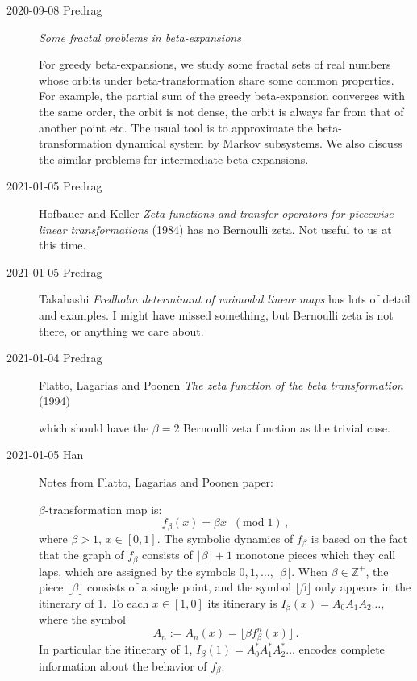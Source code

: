 \begin{description}


\item[2020-09-08 Predrag]
{\em Some fractal problems in beta-expansions}

For greedy beta-expansions, we study some fractal sets of real numbers
whose orbits under beta-transformation share some common properties. For
example, the partial sum of the greedy beta-expansion converges with the
same order, the orbit is not dense, the orbit is always far from that of
another point etc. The usual tool is to approximate the
beta-transformation dynamical system by Markov subsystems. We also
discuss the similar problems for intermediate beta-expansions.

\item[2021-01-05 Predrag]
Hofbauer and Keller {\em Zeta-functions and
transfer-operators for piecewise linear transformations} (1984) has no
Bernoulli zeta. Not useful to us at this time.

\item[2021-01-05 Predrag]
Takahashi {\em Fredholm determinant of unimodal linear
maps} has lots of detail and examples. I might have missed something, but
Bernoulli zeta is not there, or anything we care about.

\item[2021-01-04 Predrag]
Flatto, Lagarias and Poonen
{\em The zeta function of the beta transformation} (1994)

which should have the $\beta=2$ Bernoulli zeta function
as the trivial case.

\item[2021-01-05 Han] Notes from Flatto, Lagarias and Poonen paper:

$\beta$-transformation map is:
\[
f_\beta(x) = \beta x \;\; (\mbox{mod}\;1) \, ,
\]
where $\beta>1$, $x \in [0,1]$. The symbolic dynamics of $f_\beta$ is based on the fact that the graph of
$f_\beta$ consists of $\lfloor \beta \rfloor + 1$ monotone pieces which they call laps, which are
assigned by the symbols $0, 1, \dots, \lfloor \beta \rfloor$. When $\beta \in \mathbb{Z}^+$,
the piece $\lfloor \beta \rfloor$ consists of a single point, and the symbol $\lfloor \beta \rfloor$
only appears in the itinerary of 1. To each $x \in [1,0]$ its itinerary is $I_\beta(x)=A_0A_1A_2\dots$,
where the symbol
\[
A_n := A_n(x) = \lfloor \beta f_\beta^n(x) \rfloor \, .
\]
In particular the itinerary of 1, $I_\beta(1)=A^*_0A^*_1A^*_2\dots$ encodes complete information about
the behavior of $f_\beta$.


\end{description}
